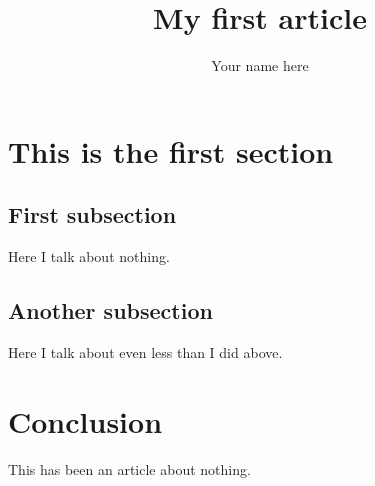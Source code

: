 \documentclass{article}
\author{Your name here}
\title{My first article}
\begin{document}
\maketitle

\section{This is the first section}

\subsection{First subsection}

Here I talk about nothing.

\subsection{Another subsection}

Here I talk about even less than I did above.

\section{Conclusion}

This has been an article about nothing.
\end{document}
